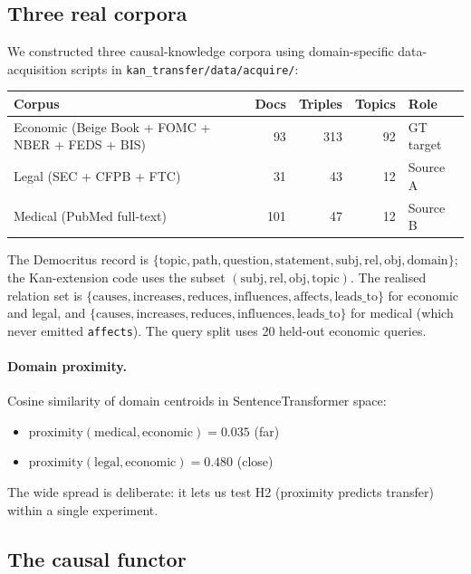 \documentclass[10pt,letterpaper]{article}
\begin{document}
\subsection{Three real corpora}

We constructed three causal-knowledge corpora using domain-specific data-acquisition scripts in \texttt{kan\_transfer/data/acquire/}:

\begin{center}
\small
\begin{tabular}{lrrrl}
\toprule
Corpus & Docs & Triples & Topics & Role \\
\midrule
Economic (Beige Book + FOMC + NBER + FEDS + BIS) & 93  & 313 & 92 & GT target \\
Legal (SEC + CFPB + FTC)                         & 31  &  43 & 12 & Source A \\
Medical (PubMed full-text)                       & 101 &  47 & 12 & Source B \\
\bottomrule
\end{tabular}
\end{center}

The Democritus record is $\{\text{topic}, \text{path}, \text{question}, \text{statement}, \text{subj}, \text{rel}, \text{obj}, \text{domain}\}$; the Kan-extension code uses the subset $(\text{subj}, \text{rel}, \text{obj}, \text{topic})$. The realised relation set is $\{\text{causes}, \text{increases}, \text{reduces}, \text{influences}, \text{affects}, \text{leads\_to}\}$ for economic and legal, and $\{\text{causes}, \text{increases}, \text{reduces}, \text{influences}, \text{leads\_to}\}$ for medical (which never emitted \texttt{affects}). The query split uses 20 held-out economic queries.

\paragraph{Domain proximity.} Cosine similarity of domain centroids in SentenceTransformer space:
\begin{itemize}
\item $\mathrm{proximity}(\text{medical}, \text{economic}) = 0.035$ (far)
\item $\mathrm{proximity}(\text{legal},   \text{economic}) = 0.480$ (close)
\end{itemize}
The wide spread is deliberate: it lets us test H2 (proximity predicts transfer) within a single experiment.

\subsection{The causal functor}
\end{document}
